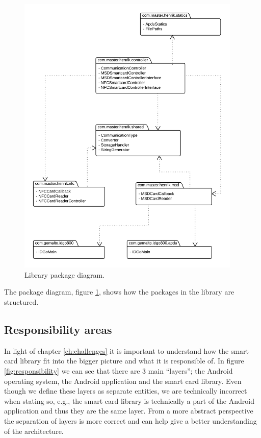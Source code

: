 \begin{figure}[h!]
  \captionsetup{justification=centering,margin=1.5cm}
  \caption{Library package diagram.}
  \label{fig:package}
  \centering
    \includegraphics[width=0.95\textwidth]{images/package2.png}
\end{figure}
The package diagram, figure \ref{fig:package}, shows how  the packages in the library are structured.

\subsection{Responsibility areas}
In light of chapter \ref{ch:challenges} it is important to understand how the smart card library fit into the bigger picture and what it is responsible of. In figure \ref{fig:responsibility} we can see that there are 3 main ``layers''; the Android operating system, the Android application and the smart card library. Even though we define these layers as separate entities, we are technically incorrect when stating so, e.g., the smart card library is technically a part of the Android application and thus they are the same layer. From a more abstract perspective the separation of layers is more correct and can help give a better understanding of the architecture.

